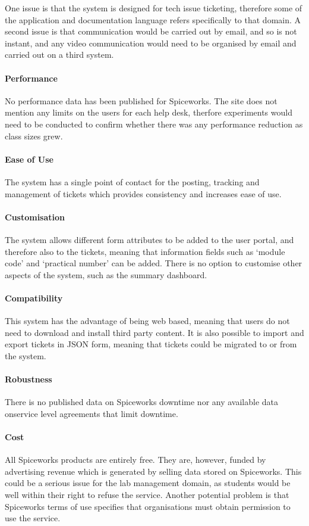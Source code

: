 One issue is that the system is designed for tech issue ticketing, therefore some of the application and documentation language refers specifically to that domain. A second issue is that communication would be carried out by email, and so is not instant, and any video communication would need to be organised by email and carried out on a third system.

\paragraph{Performance}
No performance data has been published for Spiceworks. The site does not mention any limits on the users for each help desk, therfore experiments would need to be conducted to confirm whether there was any performance reduction as class sizes grew.

\paragraph{Ease of Use} 

The system has a single point of contact for the posting, tracking and management of tickets which provides consistency and increases ease of use. 

\paragraph{Customisation} 

The system allows different form attributes to be added to the user portal, and therefore also to the tickets, meaning that information fields such as `module code' and `practical number' can be added. There is no option to customise other aspects of the system, such as the summary dashboard.


\paragraph{Compatibility}  

This system has the advantage of being web based, meaning that users do not need to download and install third party content. It is also possible to import and export tickets in JSON form, meaning that tickets could be migrated to or from the system.

\paragraph{Robustness}
There is no published data on Spiceworks downtime nor any available data onservice level agreements that limit downtime.


\paragraph{Cost}  
All Spiceworks products are entirely free. They are, however, funded by advertising revenue which is generated by selling data stored on Spiceworks. This could be a serious issue for the lab management domain, as students would be well within their right to refuse the service. Another potential problem is that Spiceworks terms of use specifies that organisations must obtain permission to use the service.

